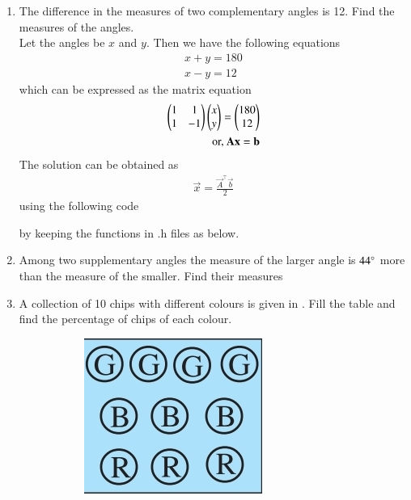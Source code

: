 \begin{enumerate}[label=\thesubsection.\arabic*, ref=\thesubsection.\theenumi,resume*]
	\item The difference in the measures of two complementary angles is 12\degree. Find the measures of the angles.
		\\
		\solution Let the angles be $x$ and $y$.  Then we have the following equations
		\begin{align}
			x+y = 180
			\\
			x-y = 12
		\end{align}
		which can be expressed as the matrix equation
		\begin{align}
		\begin{pmatrix}1 & 1 \\ 1 & -1\end{pmatrix}\begin{pmatrix}x\\y\end{pmatrix}= \begin{pmatrix}180 \\ 12\end{pmatrix}
		\\
		\text{or, } \mathbf{A}\mathbf{x} = \mathbf{b}
		\end{align}
		The solution can be obtained as
		\begin{align}
			\vec{x} = \frac{\vec{A}^{\top}\vec{b}}{2}
		\end{align}
		using the following code
	
	by keeping the functions in .h files as below.  
	
	
\item Among two supplementary angles the measure of the larger angle is $44\degree$  more than the measure of the smaller. Find their measures
\item 
	A collection of 10 chips with different colours is given in 
.
Fill the table 
and find the percentage of chips of each colour.
\begin{figure}[H]
  \centering
  \begin{subfigure}{0.4\textwidth}
    \includegraphics[width=\textwidth]{figs/percent2.jpg}

\end{subfigure}
\end{figure}
\end{enumerate}
